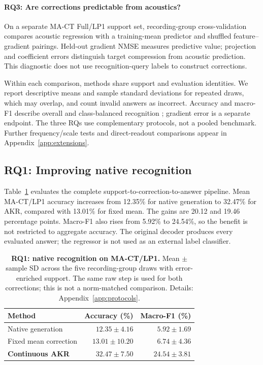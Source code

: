 \documentclass{article}
\newcommand{\method}{AKR}
\begin{document}
\paragraph{RQ3: Are corrections predictable from acoustics?}
On a separate MA-CT Full/LP1 support set, recording-group cross-validation compares acoustic regression with a training-mean predictor and shuffled feature--gradient pairings. Held-out gradient NMSE measures predictive value; projection and coefficient errors distinguish target compression from acoustic prediction. This diagnostic does not use recognition-query labels to construct corrections.

Within each comparison, methods share support and evaluation identities. We report descriptive means and sample standard deviations for repeated draws, which may overlap, and count invalid answers as incorrect. Accuracy and macro-F1 describe overall and class-balanced recognition \citep{sokolova2009systematic}; gradient error is a separate endpoint. The three RQs use complementary protocols, not a pooled benchmark. Further frequency/scale tests and direct-readout comparisons appear in Appendix~\ref{app:extensions}.

\subsection{RQ1: Improving native recognition}
\label{sec:rq1}
Table~\ref{tab:repair} evaluates the complete support-to-correction-to-answer pipeline. Mean MA-CT/LP1 accuracy increases from 12.35\% for native generation to 32.47\% for \method, compared with 13.01\% for fixed mean. The gains are 20.12 and 19.46 percentage points. Macro-F1 also rises from 5.92\% to 24.54\%, so the benefit is not restricted to aggregate accuracy. The original decoder produces every evaluated answer; the regressor is not used as an external label classifier.

\begin{table}[t]
\caption{\textbf{RQ1: native recognition on MA-CT/LP1.} Mean $\pm$ sample SD across the five recording-group draws with error-enriched support. The same raw step is used for both corrections; this is not a norm-matched comparison. Details: Appendix~\ref{app:protocols}.}
\label{tab:repair}
\centering\small
\begin{tabular}{@{}lrr@{}}
\toprule
Method & Accuracy (\%) & Macro-F1 (\%) \\
\midrule
Native generation & $12.35\pm4.16$ & $5.92\pm1.69$ \\
Fixed mean correction & $13.01\pm10.20$ & $6.74\pm4.36$ \\
\textbf{Continuous \method} & $\mathbf{32.47\pm7.50}$ & $\mathbf{24.54\pm3.81}$ \\
\bottomrule
\end{tabular}
\end{table}
\end{document}
